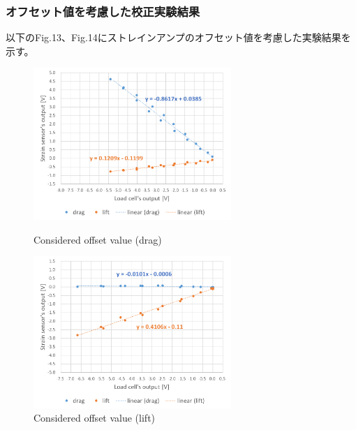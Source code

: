 \documentclass[twocolumn,a4j]{jsarticle}
\begin{document}
\subsubsection{オフセット値を考慮した校正実験結果}
以下のFig.13、Fig.14にストレインアンプのオフセット値を考慮した実験結果を示す。
\begin{figure}[htbp]
    \footnotesize
    \begin{center}
        \includegraphics[width=75mm]{../images/calibration_2_drag_offset.png}
        \caption{Considered offset value (drag)}
        \includegraphics[width=75mm]{../images/calibration_2_lift_offset.png}
        \caption{Considered offset value (lift)}
    \end{center}
\end{figure}
\newpage
\end{document}
